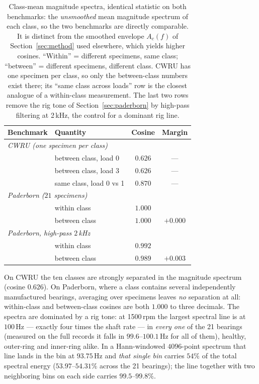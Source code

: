 \documentclass[journal]{IEEEtran}
\begin{document}
\begin{table}[t]
\centering
\caption{Class-mean magnitude spectra, identical statistic on both benchmarks:
the \emph{unsmoothed} mean magnitude spectrum of each class, so the two
benchmarks are directly comparable. It is distinct from the smoothed envelope
$A_c(f)$ of Section~\ref{sec:method} used elsewhere, which yields higher
cosines.
``Within'' = different specimens, same class; ``between'' = different
specimens, different class. CWRU has one specimen per class, so only the
between-class numbers exist there; its ``same class across loads'' row is the
closest analogue of a within-class measurement. The last two rows remove the
rig tone of Section~\ref{sec:paderborn} by high-pass filtering at 2\,kHz, the
control for a dominant rig line.}
\label{tab:bench}
\small
\begin{tabular}{llcc}
\toprule
Benchmark & Quantity & Cosine & Margin \\
\midrule
\multicolumn{4}{l}{\emph{CWRU (one specimen per class)}} \\
 & between class, load 0   & $0.626$ & --- \\
 & between class, load 3   & $0.626$ & --- \\
 & same class, load 0 vs 1 & $0.870$ & --- \\
\midrule
\multicolumn{4}{l}{\emph{Paderborn ($21$ specimens)}} \\
 & within class            & $1.000$ & \\
 & between class           & $1.000$ & $+0.000$ \\
\midrule
\multicolumn{4}{l}{\emph{Paderborn, high-pass $2$\,kHz}} \\
 & within class            & $0.992$ & \\
 & between class           & $0.989$ & $+0.003$ \\
\bottomrule
\end{tabular}
\end{table}

On CWRU the ten classes are strongly separated in the magnitude spectrum
(cosine $0.626$). On Paderborn, where a class contains several independently
manufactured bearings, averaging over specimens leaves \emph{no} separation at
all: within-class and between-class cosines are both $1.000$ to three decimals.
The spectra are dominated by a rig tone: at 1500\,rpm the largest spectral line
is at $100$\,Hz --- exactly four times the shaft rate --- in \emph{every one} of
the 21 bearings (measured on the full records it falls in $99.6$--$100.1$\,Hz
for all of them), healthy, outer-ring and inner-ring alike. In a Hann-windowed
$4096$-point spectrum that line lands in the bin at $93.75$\,Hz and
\emph{that single bin} carries $54\%$ of the total spectral energy
($53.97$--$54.31\%$ across the 21 bearings); the
line together with two neighboring bins on each side carries
$99.5$--$99.8\%$.
\end{document}
